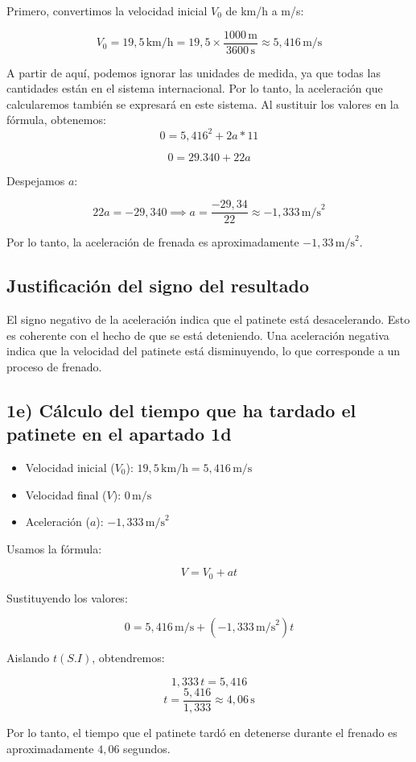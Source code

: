 \documentclass{article}
\begin{document}
Primero, convertimos la velocidad inicial \(V_0\) de km/h a m/s:

\[
V_0 = 19,5 \, \text{km/h} = 19,5 \times \frac{1000 \, \text{m}}{3600 \, \text{s}} \approx 5,416 \, \text{m/s}
\]

A partir de aquí, podemos ignorar las unidades de medida, ya que todas las cantidades están en el sistema internacional. Por lo tanto, la aceleración que calcularemos también se expresará en este sistema. Al sustituir los valores en la fórmula, obtenemos:
\[
0 = 5,416^2 + 2a*11
\]

\[
0 = 29.340 + 22a
\]

Despejamos \(a\):

\[
22a = -29,340 \implies a = \frac{-29,34}{22} \approx \boxed{-1,333 \, \text{m/s}^2}
\]

Por lo tanto, la aceleración de frenada es aproximadamente \(-1,33 \, \text{m/s}^2\).

\subsection*{Justificación del signo del resultado}

El signo negativo de la aceleración indica que el patinete está desacelerando. Esto es coherente con el hecho de que se está deteniendo. Una aceleración negativa indica que la velocidad del patinete está disminuyendo, lo que corresponde a un proceso de frenado.





\subsection*{1e) Cálculo del tiempo que ha tardado el patinete en el apartado 1d}


\begin{itemize}
    \item Velocidad inicial (\( V_0 \)): \( 19,5 \, \text{km/h} = 5,416 \, \text{m/s} \)
    \item Velocidad final (\( V \)): \( 0 \, \text{m/s} \)
    \item Aceleración (\( a \)): \( -1,333 \, \text{m/s}^2 \)
\end{itemize}

Usamos la fórmula:

\[
V = V_0 + at
\]

Sustituyendo los valores:

\[
0 = 5,416 \, \text{m/s} + (-1,333 \, \text{m/s}^2) t 
\]

Aislando \( t (S.I) \), obtendremos:

\[
1,333 \, t = 5,416 
\]
\[
t = \frac{5,416}{1,333} \approx 4,06 \, \text{s}
\]

Por lo tanto, el tiempo que el patinete tardó en detenerse durante el frenado es aproximadamente \( 4,06 \) segundos.
\end{document}

